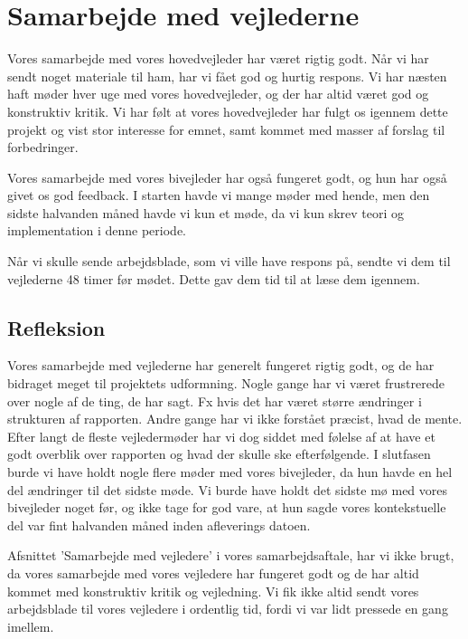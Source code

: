 \chapter{Samarbejde med vejlederne}
\label{H8R}

Vores samarbejde med vores hovedvejleder har v\ae{}ret rigtig godt. 
N\aa{}r vi har sendt noget materiale til ham, har vi f\aa{}et god og hurtig respons. 
Vi har n\ae{}sten haft m\o{}der hver uge med vores hovedvejleder, og der har altid v\ae{}ret god og
konstruktiv kritik. 
Vi har f\o{}lt at vores hovedvejleder har fulgt os igennem dette projekt og vist stor interesse for emnet, samt kommet med masser af forslag til forbedringer.

Vores samarbejde med vores bivejleder har ogs\aa{} fungeret godt, og hun har ogs\aa{} givet os god feedback. 
I starten havde vi mange m\o{}der med hende, men den sidste halvanden m\aa{}ned havde vi kun et m\o{}de, da vi kun skrev teori og implementation i denne periode.

N\aa{}r vi skulle sende arbejdsblade, som vi ville have respons p\aa{}, sendte vi dem til vejlederne 48 timer f\o{}r m\o{}det. Dette gav dem tid til at l\ae{}se dem igennem.

\section{Refleksion}
Vores samarbejde med vejlederne har generelt fungeret rigtig godt, og de har bidraget meget til projektets udformning. 
Nogle gange har vi v\ae{}ret frustrerede over nogle af de ting, de har sagt. 
Fx hvis det har v\ae{}ret st\o{}rre \ae{}ndringer i strukturen af rapporten. Andre gange har vi ikke forst\aa{}et pr\ae{}cist, hvad de
mente. 
Efter langt de fleste vejlederm\o{}der har vi dog siddet med f\o{}lelse af at have et godt overblik over rapporten og hvad der skulle ske efterf\o{}lgende. 
I slutfasen burde vi have holdt nogle flere m\o{}der med vores bivejleder, da hun havde en hel del \ae{}ndringer til det sidste m\o{}de. Vi burde have holdt det sidste m\o{} med vores bivejleder noget før, og ikke tage for god vare, at hun sagde vores kontekstuelle del var fint halvanden måned inden afleverings datoen.


Afsnittet ’Samarbejde med vejledere’ i vores samarbejdsaftale, har vi ikke brugt, da vores samarbejde med vores vejledere har fungeret godt og de har altid kommet med konstruktiv kritik og vejledning. 
Vi fik ikke altid sendt vores arbejdsblade til vores vejledere i ordentlig tid, fordi vi var lidt pressede en gang imellem.

